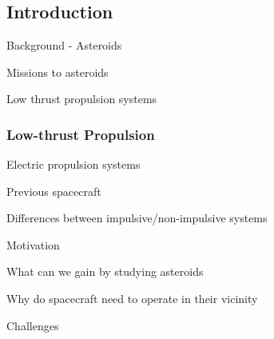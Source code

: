 \section*{}
\subsection*{Introduction}  

\begin{frame}{Background - Asteroids} %

Missions to asteroids


Low thrust propulsion systems


\end{frame}   %

\begin{frame}[t]\frametitle{Low-thrust Propulsion}
    Electric propulsion systems

    Previous spacecraft 

    Differences between impulsive/non-impulsive systems
\end{frame}

\begin{frame}[t]{Motivation}
    
What can we gain by studying asteroids

Why do spacecraft need to operate in their vicinity


\end{frame}

\begin{frame}[t]{Challenges}
    


\end{frame}